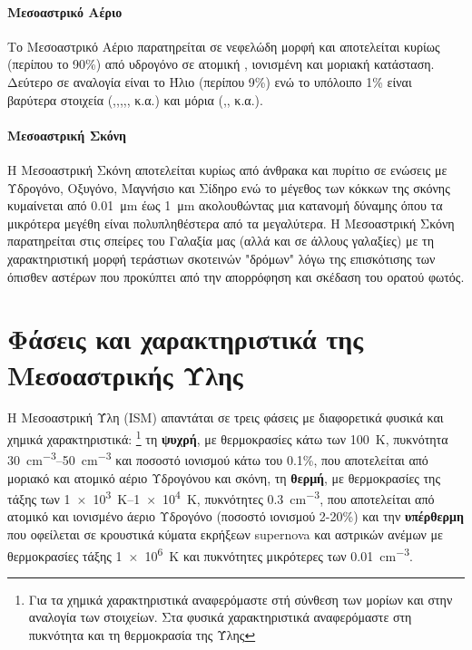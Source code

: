 \paragraph{Μεσοαστρικό Αέριο} 
Το Μεσοαστρικό Αέριο παρατηρείται σε νεφελώδη μορφή και αποτελείται κυρίως (περίπου το 90\%) από υδρογόνο σε ατομική , ιονισμένη  και μοριακή  κατάσταση. Δεύτερο σε αναλογία είναι το Ήλιο  (περίπου 9\%) ενώ το υπόλοιπο 1\% είναι βαρύτερα στοιχεία (,,,,, κ.α.) και μόρια (,, κ.α.).


\paragraph{Μεσοαστρική Σκόνη}

Η Μεσοαστρική Σκόνη αποτελείται κυρίως από άνθρακα και πυρίτιο σε ενώσεις με Υδρογόνο, Οξυγόνο, Μαγνήσιο και Σίδηρο ενώ το μέγεθος των κόκκων της σκόνης κυμαίνεται από \SI{0.01}{\micro\meter} έως \SI{1}{\micro\meter} ακολουθώντας μια κατανομή δύναμης όπου τα μικρότερα μεγέθη είναι πολυπληθέστερα από τα μεγαλύτερα. 
Η Μεσοαστρική Σκόνη παρατηρείται στις σπείρες του Γαλαξία μας (αλλά και σε άλλους γαλαξίες) με τη χαρακτηριστική μορφή τεράστιων σκοτεινών "δρόμων" λόγω της επισκότισης των όπισθεν αστέρων που προκύπτει από την απορρόφηση και σκέδαση του ορατού φωτός.


\section{Φάσεις και χαρακτηριστικά της Μεσοαστρικής Ύλης}
Η Μεσοαστρική Ύλη (ISM) απαντάται σε τρεις φάσεις με διαφορετικά φυσικά και χημικά χαρακτηριστικά: 
\footnote{Για τα χημικά χαρακτηριστικά αναφερόμαστε στή σύνθεση των μορίων και στην αναλογία των στοιχείων. Στα φυσικά χαρακτηριστικά αναφερόμαστε στη πυκνότητα και τη θερμοκρασία της Ύλης} 
τη \textbf{ψυχρή}, με θερμοκρασίες κάτω των \SI{100}{\kelvin},
 πυκνότητα \SIrange{30}{50}{cm^{-3}} και ποσοστό ιονισμού κάτω του 0.1\%, που αποτελείται από μοριακό και ατομικό αέριο Υδρογόνου και σκόνη, τη \textbf{θερμή}, με θερμοκρασίες της τάξης των \SIrange{1e3}{1e4}{K}, πυκνότητες \SI{0.3}{cm^{-3}}, που αποτελείται από ατομικό και ιονισμένο άεριο Υδρογόνο (ποσοστό ιονισμού 2-20\%) και την \textbf{υπέρθερμη} που οφείλεται σε κρουστικά κύματα εκρήξεων supernova και αστρικών ανέμων με θερμοκρασίες τάξης \SI{1e6}{K} και πυκνότητες μικρότερες των \SI{0.01}{cm^{-3}}.

